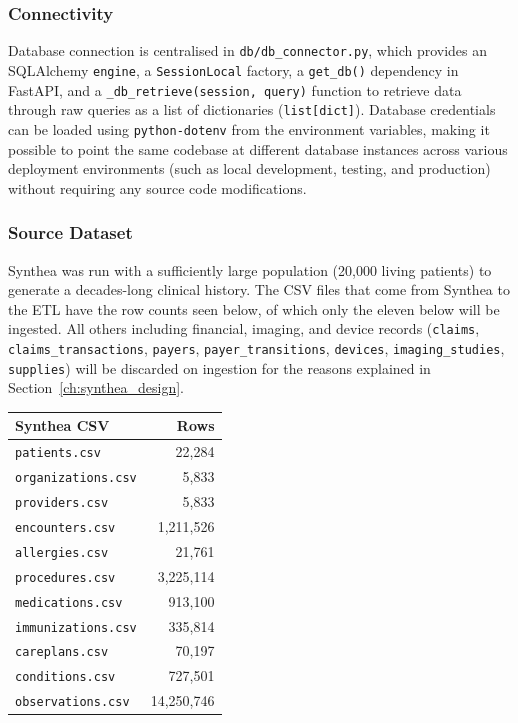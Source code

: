 \subsubsection*{Connectivity}

Database connection is centralised in \texttt{db/db\_connector.py}, which provides an SQLAlchemy \texttt{engine}, a \texttt{SessionLocal} factory, a \texttt{get\_db()} dependency in FastAPI, and a \texttt{\_db\_retrieve(session, query)} function to retrieve data through raw queries as a list of dictionaries (\texttt{list[dict]}). Database credentials can be loaded using \texttt{python-dotenv} from the environment variables, making it possible to point the same codebase at different database instances across various deployment environments (such as local development, testing, and production) without requiring any source code modifications.

\subsubsection*{Source Dataset}

Synthea was run with a sufficiently large population (20{,}000 living patients) to generate a decades-long clinical history. The CSV files that come from Synthea to the ETL have the row counts seen below, of which only the eleven below will be ingested. All others including financial, imaging, and device records (\texttt{claims}, \texttt{claims\_transactions}, \texttt{payers}, \texttt{payer\_transitions}, \texttt{devices}, \texttt{imaging\_studies}, \texttt{supplies}) will be discarded on ingestion for the reasons explained in Section~\ref{ch:synthea_design}.

\begin{center}
\begin{tabular}{lr}
\hline
\textbf{Synthea CSV} & \textbf{Rows} \\
\hline
\texttt{patients.csv}        &        22,284 \\
\texttt{organizations.csv}   &         5,833 \\
\texttt{providers.csv}       &         5,833 \\
\texttt{encounters.csv}      &     1,211,526 \\
\texttt{allergies.csv}       &        21,761 \\
\texttt{procedures.csv}      &     3,225,114 \\
\texttt{medications.csv}     &       913,100 \\
\texttt{immunizations.csv}   &       335,814 \\
\texttt{careplans.csv}       &        70,197 \\
\texttt{conditions.csv}      &       727,501 \\
\texttt{observations.csv}    &    14,250,746 \\
\hline
\end{tabular}
\end{center}

